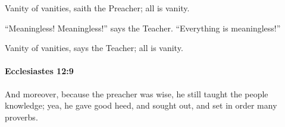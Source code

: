 			\begin{versebox}
					\item[BHS] 
					\item[LXX] 
					\item[ASV] Vanity of vanities, saith the Preacher; all is vanity.
					\item[NIV] “Meaningless! Meaningless!” says the Teacher. “Everything is meaningless!”
					\item[NRSV] Vanity of vanities, says the Teacher; all is vanity.
			\end{versebox}

		\paragraph{Ecclesiastes 12:9} %
			\label{ECCLESIASTES-12-9}

			And moreover, because the preacher was wise, he still taught the people knowledge; yea, he gave good heed, and sought out, and set in order many proverbs.

